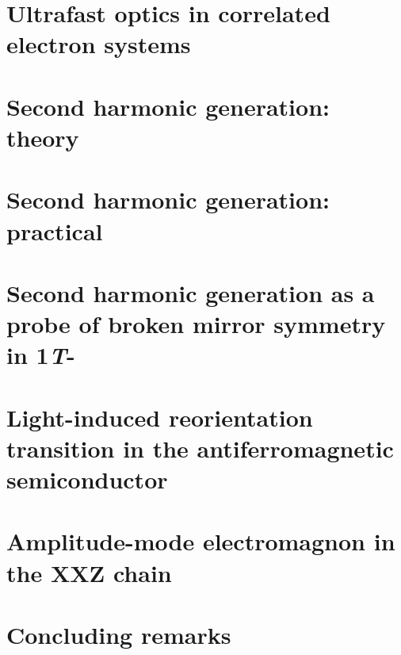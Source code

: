 \documentclass[
    letterpaper,
    12pt,
    openbib,
]{memoir}
\begin{document}
\frontmatter*


\acknowledgements

\clearpage
\preface

\clearpage

\tableofcontents
\clearpage
\listoffigures
\clearpage
\listoftables
\clearpage

\mainmatter*
\chapter{Ultrafast optics in correlated electron systems\label{ch:ch1}}

\chapter{Second harmonic generation: theory\label{ch:ch2}}

\chapter{Second harmonic generation: practical}

\chapter{Second harmonic generation as a probe of broken mirror symmetry in 1\textit{T}-}
\chapter{Light-induced reorientation transition in the antiferromagnetic semiconductor }
\chapter{Amplitude-mode electromagnon in the XXZ chain }
\chapter{Concluding remarks}

\backmatter*
\begin{thebibliography}

\end{thebibliography}
\end{document}
